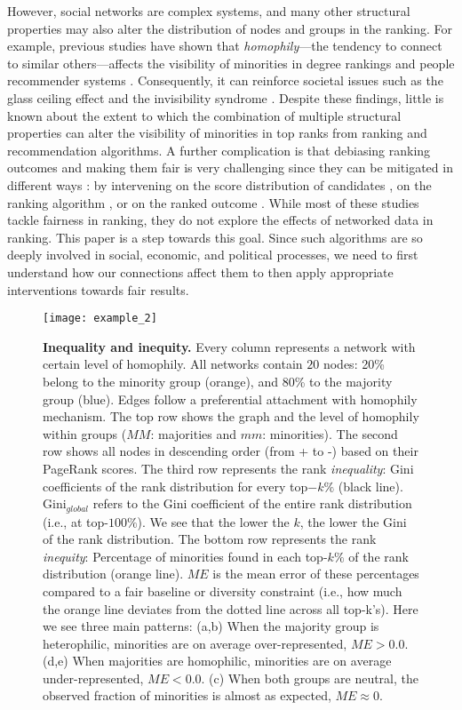 \documentclass[fleqn,10pt]{wlscirep}
\begin{document}
However, social networks are complex systems, and many other structural properties may also alter the distribution of nodes and groups in the ranking. 
For example, previous studies have shown that \textit{homophily}---the tendency to connect to similar others---affects the visibility of minorities in degree rankings \cite{karimi2018homophily} and people recommender systems \cite{fabbri2020effect}.
Consequently, it can reinforce societal issues such as the glass ceiling effect \cite{cotter2001glass, avin2015homophily, stoica2018algorithmic} and the invisibility syndrome \cite{franklin2000invisibility}. 
Despite these findings, little is known about the extent to which the combination of multiple structural properties can alter the visibility of minorities in top ranks from ranking and recommendation algorithms.
A further complication is that debiasing ranking outcomes and making them fair is very challenging
since they can be mitigated in different ways \cite{zehlike2021fairness}: by intervening on the score distribution of candidates \cite{kleinberg2018selection}, on the ranking algorithm \cite{asudeh2019designing}, or on the ranked outcome \cite{yang2017measuring}. 
While most of these studies tackle fairness in ranking, they do not explore the effects of networked data in ranking. This paper is a step towards this goal. Since such algorithms are so deeply involved in social, economic, and political processes, %
we need to first understand how our connections affect them to then apply appropriate interventions towards fair results.

\begin{figure}[ht!]
    \centering
    \texttt{[image: example\_2]}
    \caption{\textbf{Inequality and inequity.} Every column represents a network with certain level of homophily. All networks contain $20$ nodes: 20\% belong to the minority group (orange), and 80\% to the majority group (blue). Edges follow a preferential attachment with homophily mechanism. 
%
    The top row shows the graph and the level of homophily within groups ($MM$: majorities and $mm$: minorities). 
    The second row shows all nodes in descending order (from + to -) based on their PageRank scores. 
    The third row represents the rank \textit{inequality}: Gini coefficients of the rank distribution for every top$-k\%$ (black line). Gini$_{global}$ refers to the Gini coefficient of the entire rank distribution (i.e., at top-$100\%$).
%
    We see that the lower the $k$, the lower the Gini of the rank distribution.
    The bottom row represents the rank \textit{inequity}: Percentage of minorities found in each top-$k\%$ of the rank distribution (orange line). $ME$ is the mean error of these percentages compared to a fair baseline or diversity constraint (i.e., how much the orange line deviates from the dotted line across all top-k's). 
%
    Here we see three main patterns: 
    (a,b) When the majority group is heterophilic, minorities are on average over-represented, $ME>0.0$. 
    (d,e) When majorities are homophilic, minorities are on average under-represented, $ME<0.0$. 
    (c) When both groups are neutral, the observed fraction of minorities is almost as expected, $ME\approx 0$. }
    \label{fig:example}
\end{figure}
\end{document}
